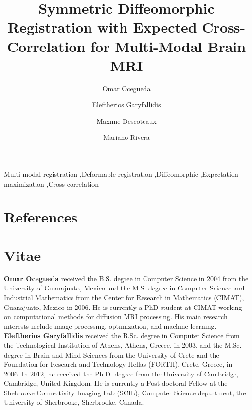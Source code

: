 \documentclass[authoryear,preprint,review,9pt]{elsarticle}
\begin{document}
\begin{frontmatter}

\title{\textbf{Symmetric Diffeomorphic Registration with Expected Cross-Correlation for Multi-Modal Brain MRI}}
\author[cimat]{Omar Ocegueda}

\author[scil]{Eleftherios Garyfallidis}

\author[scil]{Maxime Descoteaux}

\author[cimat]{Mariano Rivera}

\address[cimat]{Centro de Investigaci\'{o}n en Matem\'{a}ticas, Guanajuato, Gto, M\'{e}xico}
\address[scil]{Computer Science Department, Universit\'{e} de Sherbrooke, Sherbrooke, Qu\'{e}bec, Canada}



\begin{keyword}
Multi-modal registration \sep Deformable registration \sep Diffeomorphic \sep Expectation maximization \sep Cross-correlation
\end{keyword}

\end{frontmatter}





%
%
%
%
%

\clearpage
\section*{References}



\clearpage
\section*{Vitae}
\textbf{Omar Ocegueda} received the B.S. degree in Computer Science in 2004 from the University of Guanajuato, Mexico and the M.S. degree in Computer Science and Industrial Mathematics from the Center for Research in Mathematics (CIMAT), Guanajuato, Mexico in 2006. He is currently a PhD student at CIMAT working on computational methods for diffusion MRI processing. His main research interests include image processing, optimization, and machine learning.\\

\textbf{Eleftherios Garyfallidis} received the B.Sc. degree in Computer Science from the Technological Institution of Athens, Athens, Greece, in 2003, and the M.Sc. degree in Brain and Mind Sciences from the University of Crete and the Foundation for Research and Technology Hellas (FORTH), Crete, Greece, in 2006. In 2012, he received  the Ph.D. degree from the University of Cambridge, Cambridge, United Kingdom. He is currently a Post-doctoral Fellow at the Shebrooke Connectivity Imaging Lab (SCIL), Computer Science department, the University of Sherbrooke, Sherbrooke, Canada.\\
\end{document}
